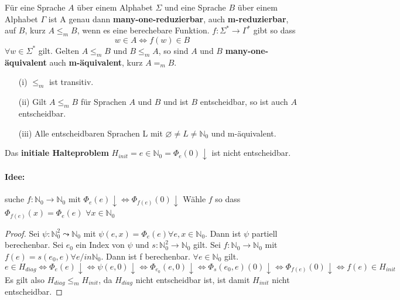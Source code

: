   Für eine Sprache \(A\) über einem Alphabet \(\Sigma\) und eine Sprache \(B\) über einem Alphabet \(\Gamma\) ist A genau dann \textbf{many-one-reduzierbar}, auch \textbf{m-reduzierbar}, auf \(B\), kurz \(A \leq_m B\), wenn es eine berechebare Funktion. \(f: \Sigma^* \to \Gamma^*\) gibt so dass \[w \in A \Leftrightarrow f(w)\in B\] \(\forall w \in \Sigma^*\) gilt. Gelten \(A \leq_m B\) und \(B \leq_{m} A\), so sind \(A\) und \(B\) \textbf{many-one-äquivalent} auch \textbf{m-äquivalent}, kurz \(A =_m B\).

  \begin{itemize}
    \item [(i)] \(\leq_m\) ist transitiv.
    \item [(ii)] Gilt \(A \leq_m B\) für Sprachen \(A\) und \(B\) und ist \(B\) entscheidbar, so ist auch \(A\) entscheidbar.
    \item [(iii)] Alle entscheidbaren Sprachen L mit \(\varnothing \not = L \not = \mathbb{N}_0\) und m-äquivalent.
  \end{itemize}

  Das \textbf{initiale Halteproblem} \(H_{init} = {e \in \mathbb{N}_0 = \Phi_e(0) \downarrow}\) ist nicht entscheidbar.

  \paragraph{Idee: } 
    suche \(f:\mathbb{N}_0 \to \mathbb{N}_0\) mit \(\Phi_e(e)\downarrow \Leftrightarrow \Phi_{f(e)}(0)\downarrow\) Wähle \(f\) so dass \(\Phi_{f(e)}(x) = \Phi_e(e)\) \(\forall x \in \mathbb{N}_0\)

  \begin{proof}
    Sei \(\psi : \mathbb{N}_0^2 \leadsto \mathbb{N}_0\) mit \(\psi (e, x) = \Phi_e(e) \forall e, x \in \mathbb{N}_0\). Dann ist \(\psi\) partiell berechenbar. Sei \(e_0\) ein Index von \(\psi\) und \(s:\mathbb{N}_0^2 \to \mathbb{N}_0\) gilt. Sei \(f: \mathbb{N}_0 \to \mathbb{N}_0\) mit \(f(e) = s(e_0, e) \forall e /in \mathbb{N}_0\). Dann ist f berechenbar. \(\forall e \in \mathbb{N}_0\) gilt. 
    \[
      e \in H_{diag} \Leftrightarrow \Phi_e(e) \downarrow \Leftrightarrow \psi(e, 0) \downarrow \Leftrightarrow \Phi_{e_0}(e, 0) \downarrow \Leftrightarrow \Phi_s (e_0, e)(0)\downarrow \Leftrightarrow \Phi_{f(e)} (0)\downarrow \Leftrightarrow f(e) \in H_{init}
    \]
    Es gilt also \(H_{diag} \leq_{m} H_{init}\), da \(H_{diag}\) nicht entscheidbar ist, ist damit \(H_{init}\) nicht entscheidbar.
  \end{proof}

